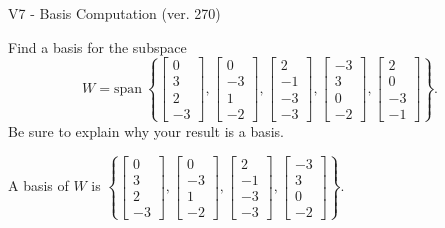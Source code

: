 \begin{exercise}
  \begin{exerciseTitle}V7 - Basis Computation (ver. 270)\end{exerciseTitle}
  \begin{exerciseStatement}
    Find a basis for the subspace 
\[W=\mathrm{span}\ \left\{\left[\begin{array}{r}
0 \\
3 \\
2 \\
-3
\end{array}\right] , \left[\begin{array}{r}
0 \\
-3 \\
1 \\
-2
\end{array}\right] , \left[\begin{array}{r}
2 \\
-1 \\
-3 \\
-3
\end{array}\right] , \left[\begin{array}{r}
-3 \\
3 \\
0 \\
-2
\end{array}\right] , \left[\begin{array}{r}
2 \\
0 \\
-3 \\
-1
\end{array}\right]\right\}.\]
 Be sure to explain why your result is a basis.


  \end{exerciseStatement}
  \begin{exerciseAnswer}
   A basis of \(W\) is  \(\left\{\left[\begin{array}{r}
0 \\
3 \\
2 \\
-3
\end{array}\right] , \left[\begin{array}{r}
0 \\
-3 \\
1 \\
-2
\end{array}\right] , \left[\begin{array}{r}
2 \\
-1 \\
-3 \\
-3
\end{array}\right] , \left[\begin{array}{r}
-3 \\
3 \\
0 \\
-2
\end{array}\right]\right\}\).
  


  \end{exerciseAnswer}
\end{exercise}